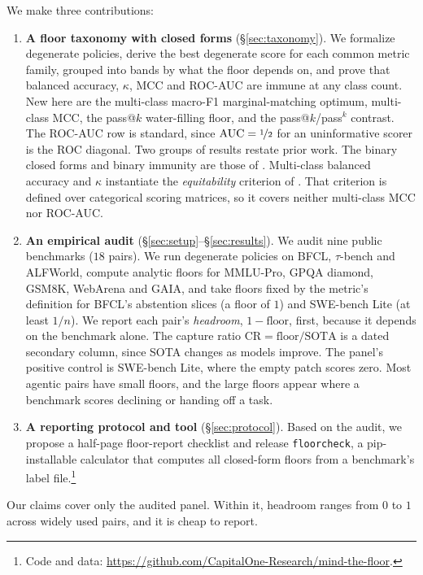 \documentclass{article}
\theoremstyle{plain}
\theoremstyle{definition}
\newcommand{\floorcheck}{\texttt{floorcheck}}
\newcommand{\CR}{\mathrm{CR}}
\begin{document}
We make three contributions:
\begin{enumerate}
  \item \textbf{A floor taxonomy with closed forms} (\S\ref{sec:taxonomy}). We formalize degenerate policies, derive the best degenerate score for each common metric family, grouped into bands by what the floor depends on, and prove that balanced accuracy, $\kappa$, MCC and ROC-AUC are immune at any class count. New here are the multi-class macro-F1 marginal-matching optimum, multi-class MCC, the pass@$k$ water-filling floor, and the pass@$k$/pass$^{k}$ contrast. The ROC-AUC row is standard, since $\mathrm{AUC} = \nicefrac{1}{2}$ for an uninformative scorer is the ROC diagonal. Two groups of results restate prior work. The binary closed forms and binary immunity are those of \citet{vandebijl2022dutchdraw}. Multi-class balanced accuracy and $\kappa$ instantiate the \emph{equitability} criterion of \citet{gandin1992equitable}. That criterion is defined over categorical scoring matrices, so it covers neither multi-class MCC nor ROC-AUC.
  \item \textbf{An empirical audit} (\S\ref{sec:setup}--\S\ref{sec:results}). We audit nine public benchmarks ($18$ pairs). We run degenerate policies on BFCL, $\tau$-bench and ALFWorld, compute analytic floors for MMLU-Pro, GPQA diamond, GSM8K, WebArena and GAIA, and take floors fixed by the metric's definition for BFCL's abstention slices (a floor of $1$) and SWE-bench Lite (at least $1/n$). We report each pair's \emph{headroom}, $1 - \mathrm{floor}$, first, because it depends on the benchmark alone. The capture ratio $\CR = \text{floor}/\text{SOTA}$ is a dated secondary column, since SOTA changes as models improve. The panel's positive control is SWE-bench Lite, where the empty patch scores zero. Most agentic pairs have small floors, and the large floors appear where a benchmark scores declining or handing off a task.
  \item \textbf{A reporting protocol and tool} (\S\ref{sec:protocol}). Based on the audit, we propose a half-page floor-report checklist and release \floorcheck{}, a pip-installable calculator that computes all closed-form floors from a benchmark's label file.\footnote{Code and data: \url{https://github.com/CapitalOne-Research/mind-the-floor}.}
\end{enumerate}

Our claims cover only the audited panel. Within it, headroom ranges from $0$ to $1$ across widely used pairs, and it is cheap to report.
\end{document}
